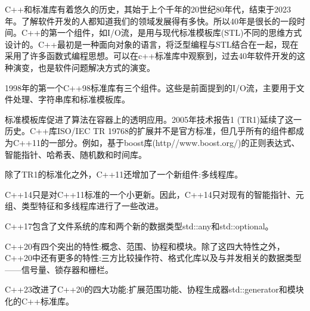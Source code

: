 C++和标准库有着悠久的历史，其始于上个千年的20世纪80年代，结束于2023年。了解软件开发的人都知道我们的领域发展得有多快。所以40年是很长的一段时间。C++的第一个组件，如I/O流，是用与现代标准模板库(STL)不同的思维方式设计的。C++最初是一种面向对象的语言，将泛型编程与STL结合在一起，现在采用了许多函数式编程思想。可以在c++标准库中观察到，过去40年软件开发的这种演变，也是软件问题解决方式的演变。


1998年的第一个C++98标准库有三个组件。这些是前面提到的I/O流，主要用于文件处理、字符串库和标准模板库。

标准模板库促进了算法在容器上的透明应用。2005年技术报告1 (TR1)延续了这一历史。C++库ISO/IEC TR 19768的扩展并不是官方标准，但几乎所有的组件都成为C++11的一部分。例如，基于boost库(http//www.boost.org/)的正则表达式、智能指针、哈希表、随机数和时间库。

除了TR1的标准化之外，C++11还增加了一个新组件:多线程库。

C++14只是对C++11标准的一个小更新。因此，C++14只对现有的智能指针、元组、类型特征和多线程库进行了一些改进。

C++17包含了文件系统的库和两个新的数据类型std::any和std::optional。

C++20有四个突出的特性:概念、范围、协程和模块。除了这四大特性之外，C++20中还有更多的特性:三方比较操作符、格式化库以及与并发相关的数据类型——信号量、锁存器和栅栏。

C++23改进了C++20的四大功能:扩展范围功能、协程生成器std::generator和模块化的C++标准库。













